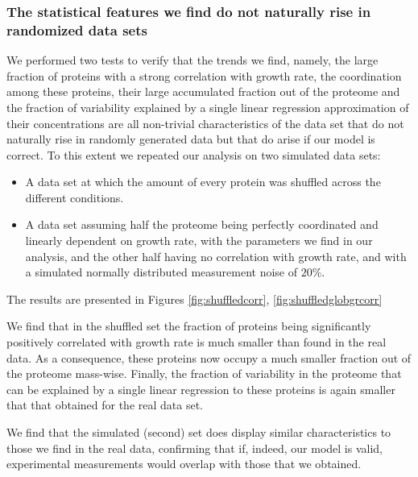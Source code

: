 \subsubsection{The statistical features we find do not naturally rise in randomized data sets}
We performed two tests to verify that the trends we find, namely, the large fraction of proteins with a strong correlation with growth rate, the coordination among these proteins, their large accumulated fraction out of the proteome and the fraction of variability explained by a single linear regression approximation of their concentrations are all non-trivial characteristics of the data set that do not naturally rise in randomly generated data but that do arise if our model is correct.
To this extent we repeated our analysis on two simulated data sets:
\begin{itemize}
\item A data set at which the amount of every protein was shuffled across the different conditions.
\item A data set assuming half the proteome being perfectly coordinated and linearly dependent on growth rate, with the parameters we find in our analysis, and the other half having no correlation with growth rate, and with a simulated normally distributed measurement noise of $20\%$.
\end{itemize}
The results are presented in Figures \ref{fig:shuffledcorr}, \ref{fig:shuffledglobgrcorr}

We find that in the shuffled set the fraction of proteins being significantly positively correlated with
growth rate is much smaller than found in the real data.
As a consequence, these proteins now occupy a much smaller fraction out of the proteome mass-wise.
Finally, the fraction of variability in the proteome that can be explained by a single linear regression to these proteins is again smaller that that obtained for the real data set.

We find that the simulated (second) set does display similar characteristics to those we find in the real data, confirming that if, indeed, our model is valid, experimental measurements would overlap with those that we obtained.